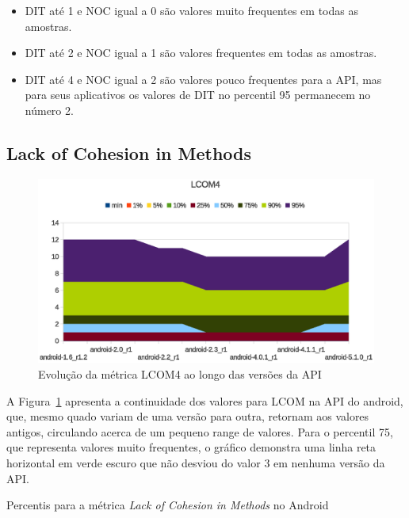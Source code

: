 \begin{itemize}
\item DIT até 1 e NOC igual a 0 são valores muito frequentes em todas as amostras.
\item DIT até 2 e NOC igual a 1 são valores frequentes em todas as amostras.
\item DIT até 4 e NOC igual a 2 são valores pouco frequentes para a API, mas para seus aplicativos os valores de DIT no percentil 95 permanecem no número 2.
\end{itemize}

\subsection{Lack of Cohesion in Methods}

\begin{figure}[!htb]
\centering
\includegraphics [keepaspectratio=true,scale=0.85]{figuras/graphs/lcom4_android.eps}
\caption{Evolução da métrica LCOM4 ao longo das versões da API}
\label{fig:lcom4_android}
\end{figure}

A Figura~\ref{fig:lcom4_android} apresenta a continuidade dos valores para LCOM na API do android, que, mesmo quado variam de uma versão para outra, retornam aos valores antigos, circulando acerca de um pequeno range de valores. Para o percentil 75, que representa valores muito frequentes, o gráfico demonstra uma linha reta horizontal em verde escuro que não desviou do valor 3 em nenhuma versão da API.

\begin{table}[!htb]

\caption{Percentis para a métrica \textit{Lack of Cohesion in Methods} no Android}
\label{tab:lcom4_android}
\end{table}

